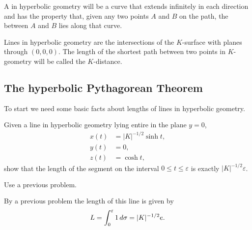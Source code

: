 \documentclass[newpage,hints,,12pt,noauthor,nooutcomes,handout]{ximera}
\begin{document}
\begin{definition}
A  in hyperbolic geometry will be a curve that extends
infinitely in each direction and has the property that, given any two
points $A$ and $B$ on the path, the  between $A$
and $B$ lies along that curve.



Lines in hyperbolic geometry are the intersections of the $K$-surface
with planes through $(0,0,0)$. The length of the shortest path between
two points in $K$-geometry will be called the $K$-distance.
\end{definition}


\subsection{The hyperbolic Pythagorean Theorem}

To start we need some basic facts about lengths of lines in hyperbolic
geometry.

\begin{problem}
  Given a line in hyperbolic geometry lying entire in the plane
  $y=0$,
  \begin{align*}
    x(t) &= |K|^{-1/2}\sinh t,\\
    y(t) &= 0,\\
    z(t) &= \cosh t,
  \end{align*}
  show that the length of the segment on the interval $0 \leq t \leq
  \varepsilon$ is exactly $|K|^{-1/2}\varepsilon$.
  \begin{hint}
    Use a previous problem.
  \end{hint}
  \begin{freeResponse}
    By a previous problem the length of this line is given by
    \[
    L=\int_{0}^{\varepsilon} 1 \,d\sigma = |K|^{-1/2}e.
    \]
  \end{freeResponse}
\end{problem}
\end{document}

